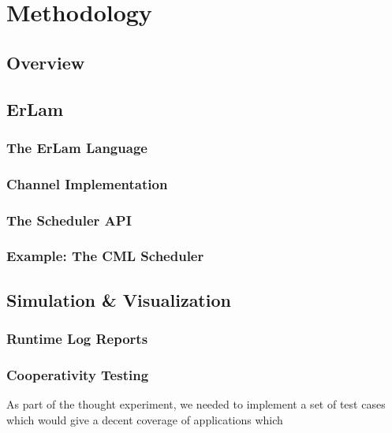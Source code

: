 \chapter{Methodology}
%
\label{chap:methodology}

\section{Overview}\label{sec:method overview}




\section{ErLam}\label{sec:erlam}

\subsection{The ErLam Language}\label{sec:the erlam language}
\subsection{Channel Implementation}\label{sec:channel implementation}
\subsection{The Scheduler API}\label{sec:the scheduler api}
\subsection{Example: The CML Scheduler}\label{sec:example the cml scheduler}


\section{Simulation \& Visualization}\label{sec:simulation and visualization}

\subsection{Runtime Log Reports}\label{sec:runtime log reports}
\subsection{Cooperativity Testing}\label{sec:cooperativity testing}

As part of the thought experiment, we needed to implement a set of test cases 
which would give a decent coverage of applications which 

